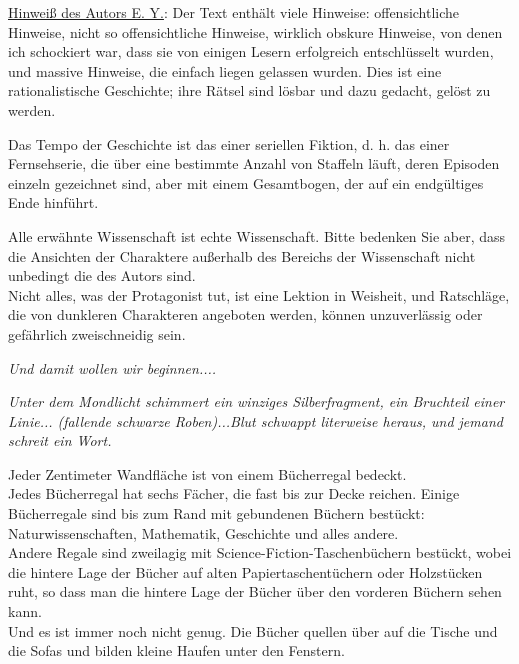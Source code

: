 

\hypertarget{ein-uxe4uuxdferst-unwahrscheinlicher-tag}{%

\uline{Hinweiß des Autors E. Y.}: Der Text enthält viele Hinweise: offensichtliche Hinweise, nicht so offensichtliche Hinweise, wirklich obskure Hinweise, von denen ich schockiert war, dass sie von einigen Lesern erfolgreich entschlüsselt wurden, und massive Hinweise, die einfach liegen gelassen wurden. Dies ist eine rationalistische Geschichte; ihre Rätsel sind lösbar und dazu gedacht, gelöst zu werden.

Das Tempo der Geschichte ist das einer seriellen Fiktion, d. h. das einer Fernsehserie, die über eine bestimmte Anzahl von Staffeln läuft, deren Episoden einzeln gezeichnet sind, aber mit einem Gesamtbogen, der auf ein endgültiges Ende hinführt.

Alle erwähnte Wissenschaft ist echte Wissenschaft. Bitte bedenken Sie aber, dass die Ansichten der Charaktere außerhalb des Bereichs der Wissenschaft nicht unbedingt die des Autors sind.\\ Nicht alles, was der Protagonist tut, ist eine Lektion in Weisheit, und Ratschläge, die von dunkleren Charakteren angeboten werden, können unzuverlässig oder gefährlich zweischneidig sein.

\emph{Und damit wollen wir beginnen....}

\emph{Unter dem Mondlicht schimmert ein winziges Silberfragment, ein Bruchteil einer Linie... (fallende schwarze Roben)...Blut schwappt literweise heraus, und jemand schreit ein Wort.}

Jeder Zentimeter Wandfläche ist von einem Bücherregal bedeckt.\\ Jedes Bücherregal hat sechs Fächer, die fast bis zur Decke reichen. Einige Bücherregale sind bis zum Rand mit gebundenen Büchern bestückt: Naturwissenschaften, Mathematik, Geschichte und alles andere.\\ Andere Regale sind zweilagig mit Science-Fiction-Taschenbüchern bestückt, wobei die hintere Lage der Bücher auf alten Papiertaschentüchern oder Holzstücken ruht, so dass man die hintere Lage der Bücher über den vorderen Büchern sehen kann.\\ Und es ist immer noch nicht genug. Die Bücher quellen über auf die Tische und die Sofas und bilden kleine Haufen unter den Fenstern.

}
